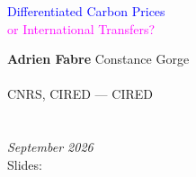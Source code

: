 \documentclass[aspectratio=169,xcolor=dvipsnames, 11pt,mathserif]{beamer}
\begin{document}

\begin{frame}
\thispagestyle{empty}
\begin{center}
\begin{LARGE}
\textcolor{blue}{Differentiated Carbon Prices}\\[.45cm]
\textcolor{magenta}{or International Transfers?} \end{LARGE}
\vspace{1cm}


\textbf{Adrien Fabre} \quad Constance Gorge \\ \quad \\
CNRS, CIRED \quad --- \quad CIRED \\ \quad \\ \quad \\
\textit{September 2026}
\\
Slides: 
\end{center}
\bigskip
\end{frame}


\end{document}
